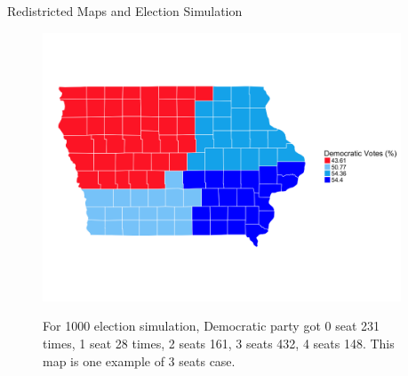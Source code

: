 \documentclass[leqno, handout]{beamer}
\theoremstyle{definition}
\begin{document}
\begin{frame}
\begin{columns}[t]
\begin{column}{.45\linewidth}
\begin{columns}[t]
\begin{column}[t]{.48\linewidth}
\begin{block}{Redistricted Maps and Election Simulation}
\begin{figure}
		\includegraphics[width=25cm]{redistricting1000.png}\\
		\caption{For 1000 election simulation, Democratic party got 0 seat 231 times, 1 seat 28 times, 2 seats 161, 3 seats 432, 4 seats 148. This map is one example of 3 seats case. }
		\end{figure}


\end{block}
\end{column}
\end{columns}


\end{column}




\begin{column}{.25\linewidth}




\end{column}
\end{columns}
\end{frame}
\end{document}
